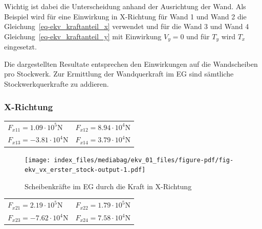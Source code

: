 \documentclass[
  letterpaper,
  DIV=11]{scrreprt}
\begin{document}
Wichtig ist dabei die Unterscheidung anhand der Ausrichtung der Wand.
Als Beispiel wird für eine Einwirkung in X-Richtung für Wand 1 und Wand
2 die Gleichung~\ref{eq-ekv_kraftanteil_x} verwendet und für die Wand 3
und Wand 4 Gleichung~\ref{eq-ekv_kraftanteil_y} mit Einwirkung
\(V_y = 0\) und für \(T_y\) wird \(T_x\) eingesetzt.

Die dargestellten Resultate entsprechen den Einwirkungen auf die
Wandscheiben pro Stockwerk. Zur Ermittlung der Wandquerkraft im EG sind
sämtliche Stockwerkquerkrafte zu addieren.

\hypertarget{x-richtung-8}{%
\subsubsection{X-Richtung}\label{x-richtung-8}}

\begin{longtable}[]{@{}
  >{\raggedright\arraybackslash}p{}
  >{\raggedright\arraybackslash}p{}@{}}
\toprule\noalign{}
\endhead
\bottomrule\noalign{}
\endlastfoot
\(F_{x 11} = 1.09 \cdot 10^{5} \text{N}\) &
\(F_{x 12} = 8.94 \cdot 10^{4} \text{N}\) \\
\(F_{x 13} = - 3.81 \cdot 10^{4} \text{N}\) &
\(F_{x 14} = 3.79 \cdot 10^{4} \text{N}\) \\
\end{longtable}

\begin{figure}[H]

{\centering \texttt{[image: index\_files/mediabag/ekv\_01\_files/figure-pdf/fig-ekv\_vx\_erster\_stock-output-1.pdf]}

}

\caption{\label{fig-ekv_vx_erster_stock}Scheibenkräfte im EG durch die
Kraft in X-Richtung}

\end{figure}

\newpage{}

\begin{longtable}[]{@{}
  >{\raggedright\arraybackslash}p{}
  >{\raggedright\arraybackslash}p{}@{}}
\toprule\noalign{}
\endhead
\bottomrule\noalign{}
\endlastfoot
\(F_{x 21} = 2.19 \cdot 10^{5} \text{N}\) &
\(F_{x 22} = 1.79 \cdot 10^{5} \text{N}\) \\
\(F_{x 23} = - 7.62 \cdot 10^{4} \text{N}\) &
\(F_{x 24} = 7.58 \cdot 10^{4} \text{N}\) \\
\end{longtable}
\end{document}
